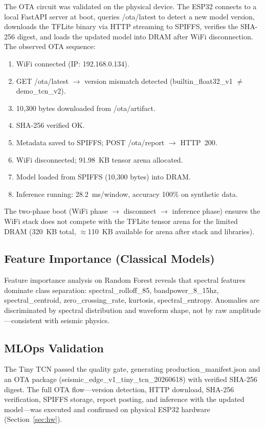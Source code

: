 \documentclass[conference]{IEEEtran}
\def\texttt#1{#1}%
\begin{document}
The OTA circuit was validated on the physical device.
The ESP32 connects to a local FastAPI server at boot, queries
\texttt{/ota/latest} to detect a new model version, downloads the TFLite
binary via HTTP streaming to SPIFFS, verifies the SHA-256 digest, and
loads the updated model into DRAM after WiFi disconnection.
The observed OTA sequence:
\begin{enumerate}
  \item WiFi connected (IP: 192.168.0.134).
  \item \texttt{GET /ota/latest} $\to$ version mismatch detected
        (\texttt{builtin\_float32\_v1} $\neq$ \texttt{demo\_tcn\_v2}).
  \item 10{,}300 bytes downloaded from \texttt{/ota/artifact}.
  \item SHA-256 verified OK.
  \item Metadata saved to SPIFFS; \texttt{POST /ota/report} $\to$ HTTP~200.
  \item WiFi disconnected; 91.98~KB tensor arena allocated.
  \item Model loaded from SPIFFS (10{,}300 bytes) into DRAM.
  \item Inference running: 28.2~ms/window, accuracy 100\% on synthetic data.
\end{enumerate}

The two-phase boot (WiFi phase $\to$ disconnect $\to$ inference phase)
ensures the WiFi stack does not compete with the TFLite tensor arena for
the limited DRAM (320~KB total, $\approx$110~KB available for arena
after stack and libraries).

\subsection{Feature Importance (Classical Models)}

Feature importance analysis on Random Forest reveals that spectral features
dominate class separation:
\texttt{spectral\_rolloff\_85}, \texttt{bandpower\_8\_15hz},
\texttt{spectral\_centroid}, \texttt{zero\_crossing\_rate},
\texttt{kurtosis}, \texttt{spectral\_entropy}.
Anomalies are discriminated by spectral distribution and waveform shape,
not by raw amplitude---consistent with seismic physics.

\subsection{MLOps Validation}

The Tiny TCN passed the quality gate, generating \texttt{production\_manifest.json}
and an OTA package (\texttt{seismic\_edge\_v1\_tiny\_tcn\_20260618}) with verified
SHA-256 digest.
The full OTA flow---version detection, HTTP download, SHA-256 verification,
SPIFFS storage, report posting, and inference with the updated model---was
executed and confirmed on physical ESP32 hardware (Section~\ref{sec:hw}).
\end{document}
